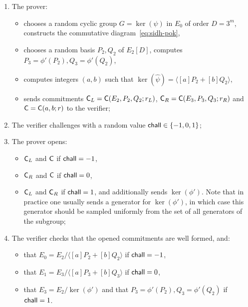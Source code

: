 \begin{enumerate}
    \item The prover:
    \begin{itemize}
        \item chooses a random cyclic group $G = \ker(\psi)$ in $E_0$ of order $D=3^m$, constructs the commutative diagram~\eqref{eq:sidh-pok}, 
        \item chooses a random basis $P_2,Q_2$ of $E_2[D]$, computes $P_3 = \phi'(P_2), Q_3 = \phi'(Q_2)$,
        \item computes integers $(a,b)$ such that $\ker(\widehat\psi) = \langle [a]P_2 + [b]Q_2\rangle$,
        \item sends commitments $\mathsf{C}_L = \mathsf{C}(E_2,P_2,Q_2; r_L)$, $\mathsf{C}_R = \mathsf{C}(E_3,P_3,Q_3; r_R)$ and $\mathsf{C} = \mathsf{C}(a,b; r)$ to the verifier;
    \end{itemize}
    \item The verifier challenges with a random value $\mathsf{chall}\in\{-1,0,1\}$;
    \item The prover opens:
    \begin{itemize}
        \item $\mathsf{C}_L$ and $\mathsf{C}$ if $\mathsf{chall} = -1$,
        \item $\mathsf{C}_R$ and $\mathsf{C}$ if $\mathsf{chall} = 0$,
        \item $\mathsf{C}_L$ and $\mathsf{C}_R$ if $\mathsf{chall} = 1$, and additionally sends $\ker(\phi')$.
        Note that in practice one usually sends a generator for $\ker(\phi')$, in which case this generator should be sampled uniformly from the set of all generators of the subgroup;
    \end{itemize}
    \item The verifier checks that the opened commitments are well formed, and:
    \begin{itemize}
        \item that $E_0 = E_2/\langle [a]P_2 + [b]Q_2\rangle$ if $\mathsf{chall} = -1$,
        \item that $E_1 = E_3/\langle [a]P_3 + [b]Q_3\rangle$ if $\mathsf{chall} = 0$,
        \item that $E_3 = E_2/\ker(\phi')$ and that $P_3 = \phi'(P_2), Q_3 = \phi'(Q_2)$ if $\mathsf{chall} = 1$.
    \end{itemize}
\end{enumerate}



